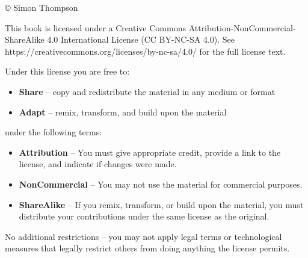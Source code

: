 \newpage
\thispagestyle{empty} {\parindent=0pt
\baselineskip

{\copyright} Simon Thompson

This book is licensed under a Creative Commons
Attribution-NonCommercial-ShareAlike 4.0 International License (CC BY-NC-SA
4.0). See https://creativecommons.org/licenses/by-nc-sa/4.0/ for the full
license text.

Under this license you are free to:

\begin{itemize}
\item \textbf{Share} -- copy and redistribute the material in any medium or format
\item \textbf{Adapt} -- remix, transform, and build upon the material
\end{itemize}

under the following terms:

\begin{itemize}
\item \textbf{Attribution} -- You must give appropriate credit, provide a link to the license, and indicate if changes were made.
\item \textbf{NonCommercial} -- You may not use the material for commercial purposes.
\item \textbf{ShareAlike} -- If you remix, transform, or build upon the material, you must distribute your contributions under the same license as the original.
\end{itemize}

No additional restrictions -- you may not apply legal terms or technological
measures that legally restrict others from doing anything the license
permits.
}

\cleardoublepage
\endinput

